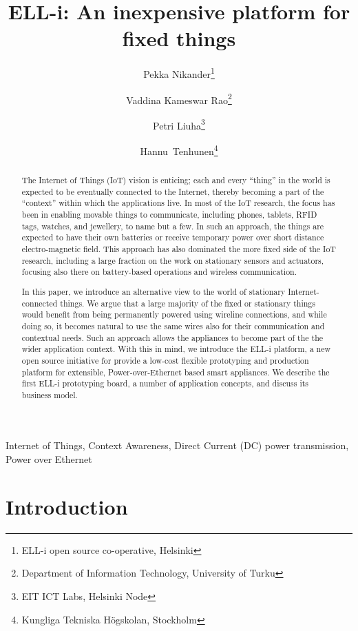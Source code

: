\documentclass{siamltex}
\title{{ELL-i}: An inexpensive platform for fixed things}
\author{Pekka Nikander\thanks{{ELL-i} open source co-operative, Helsinki}
  \and Vaddina Kameswar Rao\thanks{Department of Information Technology, University of Turku}
  \and Petri Liuha\thanks{EIT ICT Labs, Helsinki Node}
  \and \hbox{Hannu Tenhunen}\thanks{Kungliga Tekniska H\"{o}gskolan, Stockholm}}
\begin{document}
\maketitle

\begin{abstract}
The Internet of Things (IoT) vision is enticing; each and every
``thing'' in the world is expected to be eventually connected to the
Internet, thereby becoming a part of the ``context'' within which the
applications live.  
In most of the IoT research, the focus has been in enabling
movable things to communicate, including phones, tablets, RFID tags,
watches, and jewellery, to name but a few.  In such an approach, the
things are expected to have their own batteries or receive temporary
power over short distance electro-magnetic field.
This approach has also dominated the more fixed side of the
IoT research, including a large fraction on the work on stationary
sensors and actuators, focusing also there on battery-based operations
and wireless communication. 

In this paper, we introduce an alternative view to the world
of stationary Internet-connected things.  
We argue that a large majority of the fixed or
stationary things would benefit from being permanently powered using
wireline connections, and while doing so, it becomes natural to use
the same wires also for their communication and contextual needs.
Such an approach allows the appliances to become part of the
the wider application context.  With this in mind,
we introduce the
ELL-i platform, a new open source initiative for provide a low-cost
flexible prototyping and production platform for extensible,
Power-over-Ethernet based smart appliances.  We describe the first
ELL-i prototyping board,
a number of application concepts, and discuss its
business model. 
\end{abstract}

\begin{keywords} 
Internet of Things, Context Awareness, Direct Current (DC) power
transmission, Power over Ethernet
\end{keywords}

\pagestyle{myheadings}
\thispagestyle{plain}


\section{Introduction}
\end{document}

